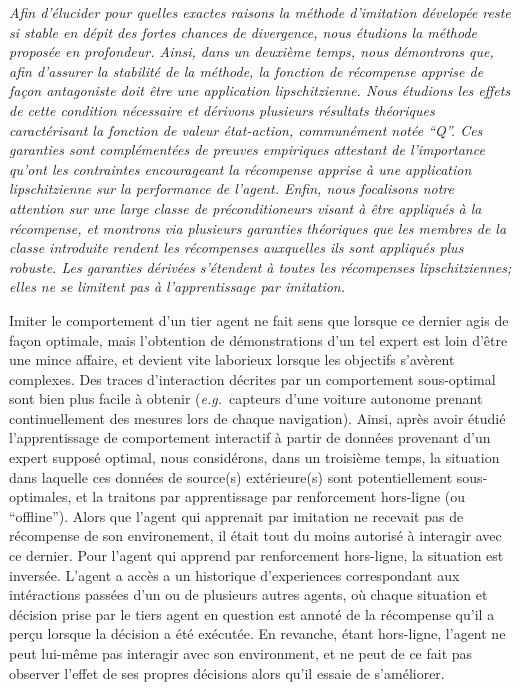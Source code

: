 \emph{%
Afin d'élucider pour quelles exactes raisons la méthode d'imitation
dévelopée reste si stable en dépit des fortes chances de divergence,
nous étudions la méthode proposée en profondeur.
Ainsi, dans un deuxième temps, nous démontrons que,
afin d'assurer la stabilité de la méthode,
la fonction de récompense apprise de façon antagoniste doit
être une application lipschitzienne.
Nous étudions les effets de cette condition nécessaire et dérivons plusieurs
résultats théoriques caractérisant la fonction de valeur état-action,
communément notée ``Q''.
Ces garanties sont complémentées de preuves empiriques attestant de l'importance
qu'ont les contraintes encourageant la récompense apprise
à une application lipschitzienne
sur la performance de l'agent.
Enfin, nous focalisons notre attention sur une large classe de préconditioneurs
visant à être appliqués à la récompense, et montrons via plusieurs garanties théoriques
que les membres de la classe introduite rendent les récompenses auxquelles ils sont
appliqués plus robuste.
Les garanties dérivées s'étendent à toutes les récompenses lipschitziennes;
elles ne se limitent pas à l'apprentissage par imitation.
}

Imiter le comportement d'un tier agent ne fait sens que lorsque ce dernier agis de
façon optimale, mais l'obtention de démonstrations d'un tel expert est loin d'être
une mince affaire, et devient vite laborieux lorsque les objectifs s'avèrent complexes.
Des traces d'interaction décrites par un comportement sous-optimal sont bien plus
facile à obtenir (\textit{e.g.}~capteurs d'une voiture autonome prenant continuellement
des mesures lors de chaque navigation).
Ainsi, après avoir étudié l'apprentissage de comportement interactif
à partir de données provenant d'un expert supposé optimal,
nous considérons, dans un troisième temps,
la situation dans laquelle ces données de source(s) extérieure(s)
sont potentiellement sous-optimales,
et la traitons par apprentissage par renforcement hors-ligne (ou ``offline'').
Alors que l'agent qui apprenait par imitation ne recevait pas de récompense
de son environement, il était tout du moins autorisé à interagir avec ce dernier.
Pour l'agent qui apprend par renforcement hors-ligne, la situation est inversée.
L'agent a accès a un historique d'experiences correspondant aux intéractions passées
d'un ou de plusieurs autres agents, où chaque situation et décision prise
par le tiers agent en question
est annoté de la récompense qu'il a perçu lorsque la décision a été exécutée.
En revanche, étant hors-ligne, l'agent ne peut lui-même pas interagir avec son environment,
et ne peut de ce fait pas observer l'effet de ses propres décisions alors qu'il essaie de
s'améliorer.

